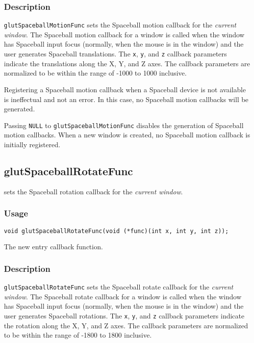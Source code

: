 \subsubsection*{Description}

{\tt glutSpaceballMotionFunc} sets the Spaceball motion callback for the {\em
current window}.  The Spaceball motion callback for a window is called when the
window has Spaceball input focus (normally, when the mouse is in the window)
and the user generates Spaceball translations.  The {\tt x}, {\tt y}, and {\tt z}
callback parameters indicate the translations along the X, Y, and Z axes.
The callback parameters are normalized to be within the range of -1000 to 1000
inclusive.

Registering a Spaceball motion callback when a Spaceball device is not available
is ineffectual and not an error.  In this case, no Spaceball motion callbacks
will be generated.

Passing {\tt NULL} to {\tt glutSpaceballMotionFunc} disables the generation of
Spaceball motion callbacks.  When a new window is created, no
Spaceball motion callback is initially registered.

\subsection{glutSpaceballRotateFunc}

 sets the Spaceball rotation callback
for the {\em current window}.

\subsubsection*{Usage}
\begin{verbatim}
void glutSpaceballRotateFunc(void (*func)(int x, int y, int z));
\end{verbatim}
\begin{description}
\itemsep 0in
\item[\tt func]
The new entry callback function.
\end{description}

\subsubsection*{Description}

{\tt glutSpaceballRotateFunc} sets the Spaceball rotate callback for the {\em
current window}.  The Spaceball rotate callback for a window is called when the
window has Spaceball input focus (normally, when the mouse is in the window)
and the user generates Spaceball rotations.  The {\tt x}, {\tt y}, and {\tt z}
callback parameters indicate the rotation along the X, Y, and Z axes.
The callback parameters are normalized to be within the range of -1800 to 1800
inclusive.

